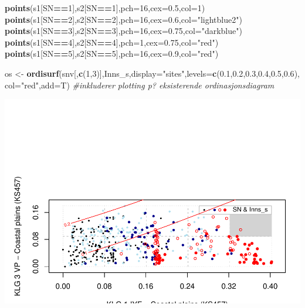 \documentclass[]{article}
\newenvironment{Shaded}{\begin{snugshade}}{\end{snugshade}}
\newcommand{\CommentTok}[1]{\textcolor[rgb]{0.56,0.35,0.01}{\textit{#1}}}
\newcommand{\DataTypeTok}[1]{\textcolor[rgb]{0.13,0.29,0.53}{#1}}
\newcommand{\DecValTok}[1]{\textcolor[rgb]{0.00,0.00,0.81}{#1}}
\newcommand{\FloatTok}[1]{\textcolor[rgb]{0.00,0.00,0.81}{#1}}
\newcommand{\KeywordTok}[1]{\textcolor[rgb]{0.13,0.29,0.53}{\textbf{#1}}}
\newcommand{\NormalTok}[1]{#1}
\newcommand{\OperatorTok}[1]{\textcolor[rgb]{0.81,0.36,0.00}{\textbf{#1}}}
\newcommand{\StringTok}[1]{\textcolor[rgb]{0.31,0.60,0.02}{#1}}
\begin{document}
\begin{Shaded}
\begin{Highlighting}[]
\KeywordTok{points}\NormalTok{(s1[SN}\OperatorTok{==}\DecValTok{1}\NormalTok{],s2[SN}\OperatorTok{==}\DecValTok{1}\NormalTok{],}\DataTypeTok{pch=}\DecValTok{16}\NormalTok{,}\DataTypeTok{cex=}\FloatTok{0.5}\NormalTok{,}\DataTypeTok{col=}\DecValTok{1}\NormalTok{)}
\KeywordTok{points}\NormalTok{(s1[SN}\OperatorTok{==}\DecValTok{2}\NormalTok{],s2[SN}\OperatorTok{==}\DecValTok{2}\NormalTok{],}\DataTypeTok{pch=}\DecValTok{16}\NormalTok{,}\DataTypeTok{cex=}\FloatTok{0.6}\NormalTok{,}\DataTypeTok{col=}\StringTok{"lightblue2"}\NormalTok{)}
\KeywordTok{points}\NormalTok{(s1[SN}\OperatorTok{==}\DecValTok{3}\NormalTok{],s2[SN}\OperatorTok{==}\DecValTok{3}\NormalTok{],}\DataTypeTok{pch=}\DecValTok{16}\NormalTok{,}\DataTypeTok{cex=}\FloatTok{0.75}\NormalTok{,}\DataTypeTok{col=}\StringTok{"darkblue"}\NormalTok{)}
\KeywordTok{points}\NormalTok{(s1[SN}\OperatorTok{==}\DecValTok{4}\NormalTok{],s2[SN}\OperatorTok{==}\DecValTok{4}\NormalTok{],}\DataTypeTok{pch=}\DecValTok{1}\NormalTok{,}\DataTypeTok{cex=}\FloatTok{0.75}\NormalTok{,}\DataTypeTok{col=}\StringTok{"red"}\NormalTok{)}
\KeywordTok{points}\NormalTok{(s1[SN}\OperatorTok{==}\DecValTok{5}\NormalTok{],s2[SN}\OperatorTok{==}\DecValTok{5}\NormalTok{],}\DataTypeTok{pch=}\DecValTok{16}\NormalTok{,}\DataTypeTok{cex=}\FloatTok{0.9}\NormalTok{,}\DataTypeTok{col=}\StringTok{"red"}\NormalTok{)}

\NormalTok{os <-}\StringTok{ }\KeywordTok{ordisurf}\NormalTok{(snv[,}\KeywordTok{c}\NormalTok{(}\DecValTok{1}\NormalTok{,}\DecValTok{3}\NormalTok{)],Inns_s,}\DataTypeTok{display=}\StringTok{"sites"}\NormalTok{,}\DataTypeTok{levels=}\KeywordTok{c}\NormalTok{(}\FloatTok{0.1}\NormalTok{,}\FloatTok{0.2}\NormalTok{,}\FloatTok{0.3}\NormalTok{,}\FloatTok{0.4}\NormalTok{,}\FloatTok{0.5}\NormalTok{,}\FloatTok{0.6}\NormalTok{), }\DataTypeTok{col=}\StringTok{"red"}\NormalTok{,}\DataTypeTok{add=}\NormalTok{T) }\CommentTok{#inkluderer plotting p? eksisterende ordinasjonsdiagram}
\end{Highlighting}
\end{Shaded}

\includegraphics{Landscape_analysis_example_4_files/figure-latex/unnamed-chunk-48-1.pdf}
\end{document}
